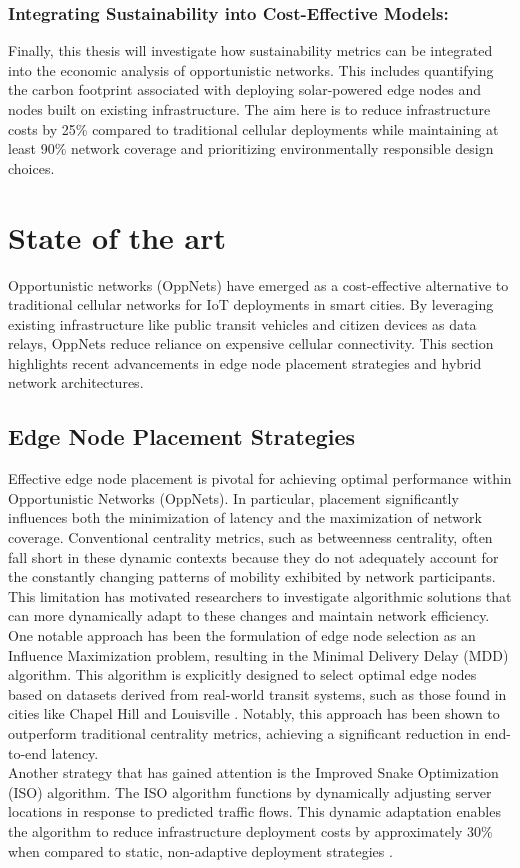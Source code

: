 \documentclass[10pt,a4paper]{report}
\begin{document}
\subsection{Integrating Sustainability into Cost-Effective Models:}
Finally, this thesis will investigate how sustainability metrics can be integrated
into the economic analysis of opportunistic networks. This includes quantifying
the carbon footprint associated with deploying solar-powered edge nodes and nodes
built on existing infrastructure. The aim here is to reduce infrastructure costs
by 25\% compared to traditional cellular deployments while maintaining at least
90\% network coverage and prioritizing environmentally responsible design choices.


\chapter{State of the art}

Opportunistic networks (OppNets) have emerged as a cost-effective alternative to
traditional cellular networks for IoT deployments in smart cities. By leveraging
existing infrastructure like public transit vehicles and citizen devices as data
relays, OppNets reduce reliance on expensive cellular connectivity. This section
highlights recent advancements in edge node placement strategies and hybrid network
architectures.

\section{Edge Node Placement Strategies}
Effective edge node placement is pivotal for achieving optimal performance within
Opportunistic Networks (OppNets). In particular, placement significantly influences
both the minimization of latency and the maximization of network coverage.
Conventional centrality metrics, such as betweenness centrality, often fall
short in these dynamic contexts because they do not adequately account for the
constantly changing patterns of mobility exhibited by network participants. This
limitation has motivated researchers to investigate algorithmic solutions that
can more dynamically adapt to these changes and maintain network efficiency.\\
One notable approach has been the formulation of edge node selection as an
Influence Maximization problem, resulting in the Minimal Delivery Delay (MDD)
algorithm. This algorithm is explicitly designed to select optimal edge nodes
based on datasets derived from real-world transit systems, such as those found
in cities like Chapel Hill and Louisville \cite{LatencyDefined2021}. Notably,
this approach has been shown to outperform traditional centrality metrics,
achieving a significant reduction in end-to-end latency.\\
Another strategy that has gained attention is the Improved Snake Optimization
(ISO) algorithm. The ISO algorithm functions by dynamically adjusting server
locations in response to predicted traffic flows. This dynamic adaptation
enables the algorithm to reduce infrastructure deployment costs by approximately
30\% when compared to static, non-adaptive deployment strategies \cite{Liu_2024}.
\end{document}
